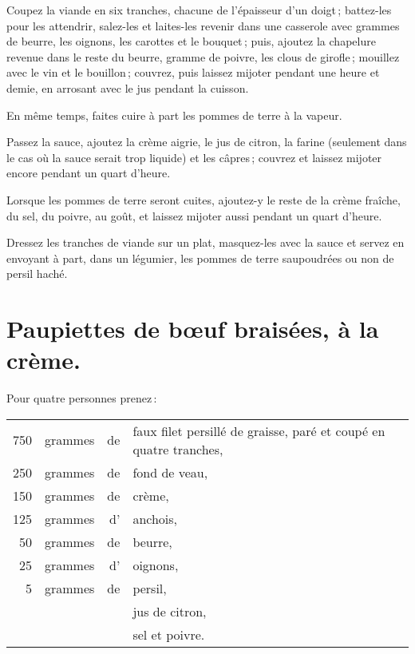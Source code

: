 Coupez la viande en six tranches, chacune de l'épaisseur d'un doigt ;
battez-les pour les attendrir, salez-les et laites-les revenir dans une
casserole avec {\mmm} grammes de beurre, les oignons, les carottes et le bouquet ;
puis, ajoutez la chapelure revenue dans le reste du beurre, {\mmm} gramme de poivre,
les clous de girofle ; mouillez avec le vin et le bouillon ; couvrez, puis
laissez mijoter pendant une heure et demie, en arrosant avec le jus pendant la
cuisson.

En même temps, faites cuire à part les pommes de terre à la vapeur.

Passez la sauce, ajoutez la crème aigrie, le jus de citron, la farine
(seulement dans le cas où la sauce serait trop liquide) et les câpres ; couvrez
et laissez mijoter encore pendant un quart d'heure.

Lorsque les pommes de terre seront cuites, ajoutez-y le reste de la crème
fraîche, du sel, du poivre, au goût, et laissez mijoter aussi pendant un quart
d'heure.

Dressez les tranches de viande sur un plat, masquez-les avec la sauce et servez
en envoyant à part, dans un légumier, les pommes de terre saupoudrées ou non de
persil haché.

\section*{\centering Paupiettes de bœuf braisées, à la crème.}
{}

Pour quatre personnes prenez :

\medskip

\footnotesize
\begin{longtable}{rrrp{16em}}
    750 & grammes & de & faux filet persillé de graisse, paré et coupé en quatre tranches,                \\
    250 & grammes & de & fond de veau,                                                                    \\
    150 & grammes & de & crème,                                                                           \\
    125 & grammes & d' & anchois,                                                                         \\
     50 & grammes & de & beurre,                                                                          \\
     25 & grammes & d' & oignons,                                                                         \\
      5 & grammes & de & persil,                                                                          \\
        &         &    & jus de citron,                                                                   \\
        &         &    & sel et poivre.                                                                   \\
\end{longtable}
\normalsize

